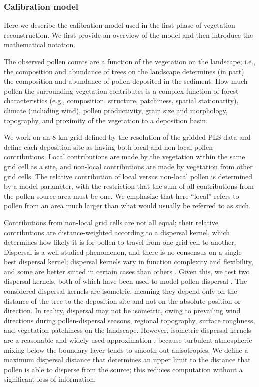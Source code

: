 \documentclass[12pt]{article}
\begin{document}

\subsubsection{Calibration model}
\label{sec:cal}

Here we describe the calibration model used in the first phase of
vegetation reconstruction. We first provide an overview of the model
and then introduce the mathematical notation.

The observed pollen counts are a function of the vegetation on the
landscape; i.e., the composition and abundance of trees on the
landscape determines (in part) the composition and abundance of pollen
deposited in the sediment. How much pollen the surrounding vegetation
contributes is a complex function of forest characteristics (e.g.,
composition, structure, patchiness, spatial stationarity), climate
(including wind), pollen productivity, grain size and morphology,
topography, and proximity of the vegetation to a deposition basin.

We work on an 8 km grid defined by the resolution of the gridded PLS
data and define each deposition site as having both local and
non-local pollen contributions. Local contributions are made by the
vegetation within the same grid cell as a site, and non-local
contributions are made by vegetation from other grid cells. The
relative contribution of local versus non-local pollen is determined
by a model parameter, with the restriction that the sum of all
contributions from the pollen source area must be one. We emphasize
that here ``local'' refers to pollen from an area much larger than
what would usually be referred to as such.

Contributions from non-local grid cells are not all equal; their
relative contributions are distance-weighted according to a dispersal
kernel, which determines how likely it is for pollen to travel from
one grid cell to another. Dispersal is a well-studied phenomenon, and
there is no consensus on a single best dispersal kernel; dispersal
kernels vary in function complexity and flexibility, and some are
better suited in certain cases than others
\citep{clobert2012dispersal}. Given this, we test two dispersal
kernels, both of which have been used to model pollen dispersal
\citep{clobert2012dispersal}. The considered dispersal kernels are
isometric, meaning they depend only on the distance of the tree to the
deposition site and not on the absolute position or direction. In
reality, dispersal may not be isometric, owing to prevailing wind
directions during pollen-dispersal seasons, regional topography,
surface roughness, and vegetation patchiness on the
landscape. However, isometric dispersal kernels are a reasonable and
widely used approximation \citep{sugita2007theory1,
  sugita2007theory2}, because turbulent atmospheric mixing below the
boundary layer tends to smooth out anisotropies. We define a maximum
dispersal distance that determines an upper limit to the distance that
pollen is able to disperse from the source; this reduces computation
without a significant loss of information.
\end{document}
